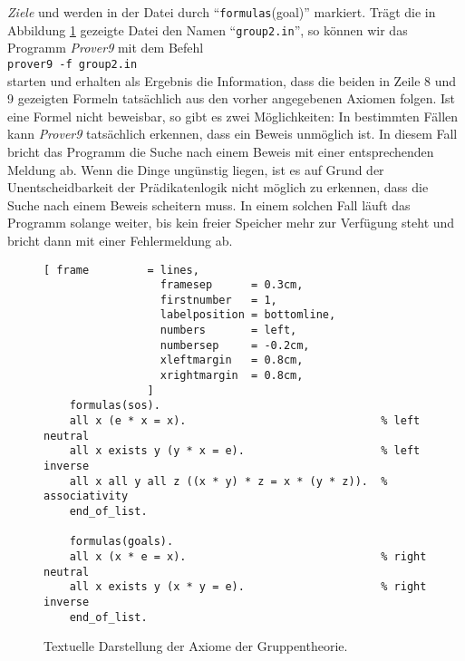 \emph{Ziele} und werden in der Datei durch ``\texttt{formulas}(goal)'' markiert.
Tr\"{a}gt die in Abbildung \ref{fig:group2.in} gezeigte Datei den Namen ``\texttt{group2.in}'', so k\"{o}nnen wir das
Programm \textsl{Prover9} mit dem Befehl 
\\[0.2cm]
\hspace*{1.3cm}
\texttt{prover9 -f group2.in}
\\[0.2cm]
starten und erhalten als Ergebnis die Information, dass die beiden in Zeile 8 und 9 gezeigten Formeln
tats\"{a}chlich aus den vorher angegebenen Axiomen folgen.  Ist eine Formel nicht beweisbar, so gibt es zwei M\"{o}glichkeiten:
In bestimmten F\"{a}llen kann \textsl{Prover9} tats\"{a}chlich erkennen, dass ein Beweis unm\"{o}glich ist.  In
diesem Fall bricht das Programm die Suche nach einem Beweis mit einer entsprechenden Meldung ab.
Wenn die Dinge ung\"{u}nstig liegen, ist es auf Grund der Unentscheidbarkeit der Pr\"{a}dikatenlogik nicht
m\"{o}glich zu erkennen, dass die Suche nach einem Beweis scheitern muss.  In einem solchen Fall
l\"{a}uft das Programm solange weiter, bis kein freier Speicher mehr zur Verf\"{u}gung steht und
bricht dann mit einer Fehlermeldung ab.


\begin{figure}[!ht]
\centering
\begin{Verbatim}[ frame         = lines, 
                  framesep      = 0.3cm, 
                  firstnumber   = 1,
                  labelposition = bottomline,
                  numbers       = left,
                  numbersep     = -0.2cm,
                  xleftmargin   = 0.8cm,
                  xrightmargin  = 0.8cm,
                ]
    formulas(sos).
    all x (e * x = x).                              % left neutral 
    all x exists y (y * x = e).                     % left inverse
    all x all y all z ((x * y) * z = x * (y * z)).  % associativity
    end_of_list.
    
    formulas(goals).
    all x (x * e = x).                              % right neutral 
    all x exists y (x * y = e).                     % right inverse
    end_of_list.
\end{Verbatim}
\vspace*{-0.3cm}
\caption{Textuelle Darstellung der Axiome der Gruppentheorie.}
\label{fig:group2.in}
\end{figure}



